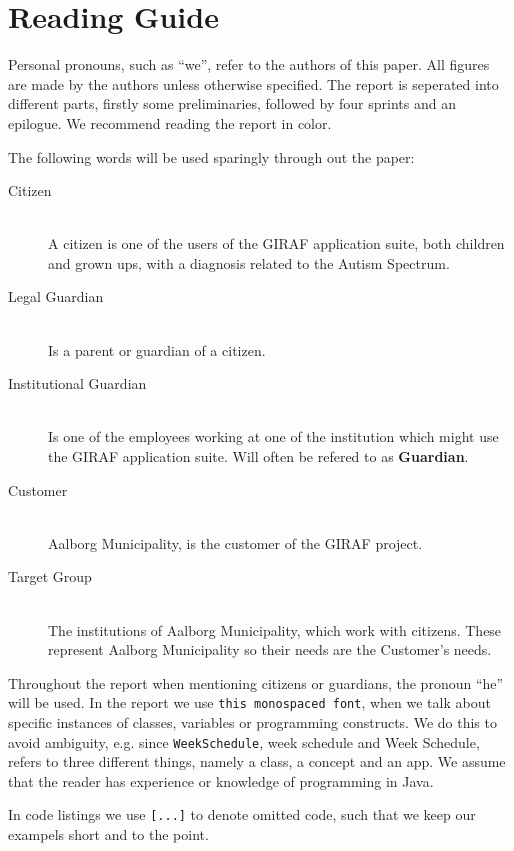 \chapter*{Reading Guide}
Personal pronouns, such as \enquote{we}, refer to the authors of this paper.
All figures are made by the authors unless otherwise specified.
The report is seperated into different parts, firstly some preliminaries, followed by four sprints and an epilogue.
We recommend reading the report in color.

\bigskip\noindent
The following words will be used sparingly through out the paper:
\begin{description}
    \item[Citizen] \hfill\\
        A citizen is one of the users of the GIRAF application suite, both children and grown ups, with a diagnosis related to the Autism Spectrum.
	\item[Legal Guardian] \hfill\\
        Is a parent or guardian of a citizen.
    \item[Institutional Guardian] \hfill\\
        Is one of the employees working at one of the institution which might use the GIRAF application suite. Will often be refered to as \textbf{Guardian}.
	\item[Customer] \hfill\\
        Aalborg Municipality, is the customer of the GIRAF project.
	\item[Target Group] \hfill\\
        The institutions of Aalborg Municipality, which work with citizens. These represent Aalborg Municipality so their needs are the Customer's needs.
\end{description}

\bigskip
Throughout the report when mentioning citizens or guardians, the pronoun \enquote{he} will be used.
In the report we use \texttt{this monospaced font}, when we talk about specific instances of classes, variables or programming constructs.
We do this to avoid ambiguity, e.g. since \texttt{WeekSchedule}, week schedule and Week Schedule, refers to three different things, namely a class, a concept and an app.
We assume that the reader has experience or knowledge of programming in Java.

In code listings we use \texttt{[...]} to denote omitted code, such that we keep our exampels short and to the point.

